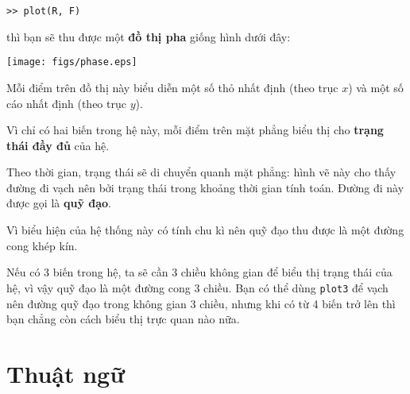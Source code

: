 \documentclass[12pt]{book}
\begin{document}
\begin{verbatim}
>> plot(R, F)
\end{verbatim}
%
thì bạn sẽ thu được một {\bf đồ thị pha} giống hình dưới đây:

\centerline{\texttt{[image: figs/phase.eps]}}

Mỗi điểm trên đồ thị này biểu diễn một số thỏ nhất định (theo trục $x$)
và một số cáo nhất định (theo trục $y$).

Vì chỉ có hai biến trong hệ này, mỗi điểm trên mặt phẳng biểu thị
cho {\bf trạng thái đầy đủ} của hệ.

Theo thời gian, trạng thái sẽ di chuyển quanh mặt phẳng: hình vẽ
này cho thấy đường đi vạch nên bởi trạng thái trong khoảng thời
gian tính toán. Đường đi này được gọi là {\bf quỹ đạo}.

Vì biểu hiện của hệ thống này có tính chu kì nên quỹ đạo thu được
là một đường cong khép kín.

Nếu có 3 biến trong hệ, ta sẽ cần 3 chiều không gian để biểu thị
trạng thái của hệ, vì vậy quỹ đạo là một đường cong 3 chiều. Bạn
có thể dùng {\tt plot3} để vạch nên đường quỹ đạo trong không gian
3 chiều, nhưng khi có từ 4 biến trở lên thì bạn chẳng còn cách
biểu thị trực quan nào nữa.


\section{Thuật ngữ}
\end{document}
